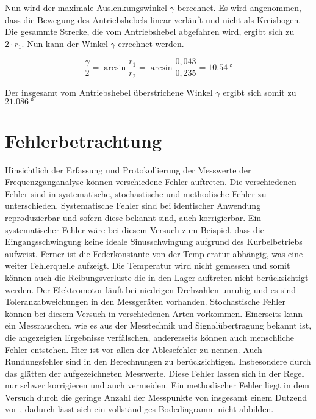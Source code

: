 \documentclass[a4paper,12pt]{scrartcl}
\begin{document}
Nun wird der maximale Auslenkungswinkel $\gamma$ berechnet. Es wird angenommen, dass die Bewegung des Antriebshebels linear verläuft und nicht als Kreisbogen.
Die gesammte Strecke, die vom Antriebshebel abgefahren wird, ergibt sich zu $2 \cdot r_1$. Nun kann der Winkel $\gamma$ errechnet werden.

\begin{equation}
	\frac{\gamma}{2} = \arcsin{\frac{r_1}{r_2}} = \arcsin{\frac{0,043}{0,235}} =  \SI{10,54}{\degree}
\end{equation}

Der insgesamt vom Antriebshebel überstrichene Winkel $\gamma$ ergibt sich somit zu $\SI{21,086}{\degree}$

\section{Fehlerbetrachtung}
Hinsichtlich der Erfassung und Protokollierung der Messwerte der
Frequenzganganalyse können verschiedene Fehler auftreten. Die verschiedenen Fehler
sind in systematische, stochastische und methodische Fehler zu unterschieden.
Systematische Fehler sind bei identischer Anwendung reproduzierbar und sofern diese
bekannt sind, auch korrigierbar. Ein systematischer Fehler wäre bei diesem Versuch
zum Beispiel, dass die Eingangsschwingung keine ideale Sinusschwingung aufgrund
des Kurbelbetriebs aufweist. Ferner ist die Federkonstante von der Temp eratur
abhängig, was eine weiter Fehlerquelle aufzeigt. Die Temperatur wird nicht gemessen
und somit können auch die Reibungsverluste die in den Lager auftreten nicht
berücksichtigt werden. Der Elektromotor läuft bei niedrigen Drehzahlen unruhig und
es sind Toleranzabweichungen in den Messgeräten vorhanden. Stochastische Fehler
können bei diesem Versuch in verschiedenen Arten vorkommen. Einerseits kann ein
Messrauschen, wie es aus der Messtechnik und Signalübertragung bekannt ist, die
angezeigten Ergebnisse verfälschen, andererseits können auch menschliche Fehler
entstehen. Hier ist vor allen der Ablesefehler zu nennen. Auch Rundungsfehler sind
in den Berechnungen zu berücksichtigen. Insbesondere durch das glätten der
aufgezeichneten Messwerte. Diese Fehler lassen sich in der Regel nur schwer
korrigieren und auch vermeiden. Ein methodischer Fehler liegt in dem Versuch durch
die geringe Anzahl der Messpunkte von insgesamt einem Dutzend vor , dadurch lässt sich
ein vollständiges Bodediagramm nicht abbilden.
\end{document}
